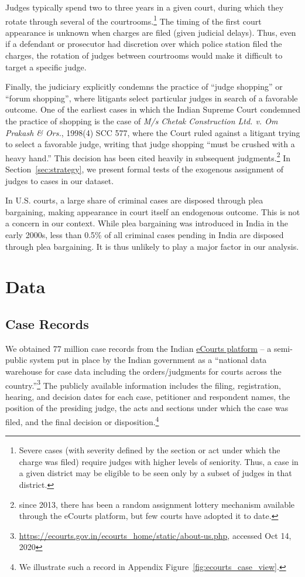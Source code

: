 \documentclass[12pt,english]{article}
\begin{document}
Judges typically spend two to three years in a given court, during which they rotate through several of the courtrooms.\footnote{Severe cases (with severity defined by the section or act under which the charge was filed) require judges with higher levels of seniority. Thus, a case in a given district may be eligible to be seen only by a subset of judges in that district.} The timing of the first court appearance is unknown when charges are filed (given judicial delays). Thus, even if a defendant or prosecutor had discretion over which police station filed the charges, the rotation of judges between courtrooms would make it difficult to target a specific judge. 

Finally, the judiciary explicitly condemns the practice of ``judge shopping'' or ``forum shopping'', where litigants select particular judges in search of a favorable outcome. One of the earliest cases in which the Indian Supreme Court condemned the practice of shopping is the case of \textit{M/s Chetak Construction Ltd. v. Om Prakash \& Ors.}, 1998(4) SCC 577, where the Court ruled against a litigant trying to select a favorable judge, writing that judge shopping ``must be crushed with a heavy hand.'' This decision has been cited heavily in subsequent judgments.\footnote{since 2013, there has been a random assignment lottery mechanism available through the eCourts platform, but few courts have adopted it to date.} In Section~\ref{sec:strategy}, we present formal tests of the exogenous assignment of judges to cases in our dataset.

In U.S. courts, a large share of criminal cases are disposed through plea bargaining, making appearance in court itself an endogenous outcome. This is not a concern in our context. While plea bargaining was introduced in India in the early 2000s, less than 0.5\% of all criminal cases pending in India are disposed through plea bargaining. It is thus unlikely to play a major factor in our analysis.

\section{Data}
\label{sec:data}

\subsection{Case Records}

We obtained 77 million case records from the Indian \href{https://ecourts.gov.in}{eCourts platform} -- a semi-public system put in place by the Indian government as a ``national data warehouse for case data including the orders/judgments for courts across the country.''\footnote{\href{https://ecourts.gov.in/ecourts_home/static/about-us.php}{https://ecourts.gov.in/ecourts\_home/static/about-us.php}, accessed Oct 14, 2020} The publicly available information includes the filing, registration, hearing, and decision dates for each case, petitioner and respondent names, the position of the presiding judge, the acts and sections under which the case was filed, and the final decision or disposition.\footnote{We illustrate such a record in Appendix Figure~\ref{fig:ecourts_case_view}.}
\end{document}
